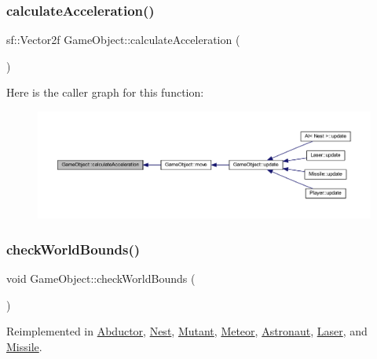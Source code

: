 \subsubsection{\texorpdfstring{calculate\+Acceleration()}{calculateAcceleration()}}
{\footnotesize\ttfamily sf\+::\+Vector2f Game\+Object\+::calculate\+Acceleration (\begin{DoxyParamCaption}{ }\end{DoxyParamCaption})\hspace{0.3cm}{\ttfamily [protected]}}

Here is the caller graph for this function\+:
\nopagebreak
\begin{figure}[H]
\begin{center}
\leavevmode
\includegraphics[width=350pt]{class_game_object_a353ce0e2b43911b153f1b917cefaa45e_icgraph}
\end{center}
\end{figure}
\mbox{\label{class_game_object_a07bcaf0d87bd507f0a6e98abebd70e53}} 
\subsubsection{\texorpdfstring{check\+World\+Bounds()}{checkWorldBounds()}}
{\footnotesize\ttfamily void Game\+Object\+::check\+World\+Bounds (\begin{DoxyParamCaption}{ }\end{DoxyParamCaption})\hspace{0.3cm}{\ttfamily [virtual]}}



Reimplemented in \hyperlink{class_abductor_a4b86fdcd63a060c53da22f092a113b24}{Abductor}, \hyperlink{class_nest_ab62ba42fc4c7e4c043f29e59ab8c8ea3}{Nest}, \hyperlink{class_mutant_af5b703545939ef9295ecbe2762947995}{Mutant}, \hyperlink{class_meteor_a8cedf36b39790de3b1e9882c36428e47}{Meteor}, \hyperlink{class_astronaut_a362cf11f645801a8067efaa1f9310e4c}{Astronaut}, \hyperlink{class_laser_a59c9d2f9bbefdbc978232acf0a1fa978}{Laser}, and \hyperlink{class_missile_a49c9929ea51ad8a2a8da96e0c39e6095}{Missile}.

